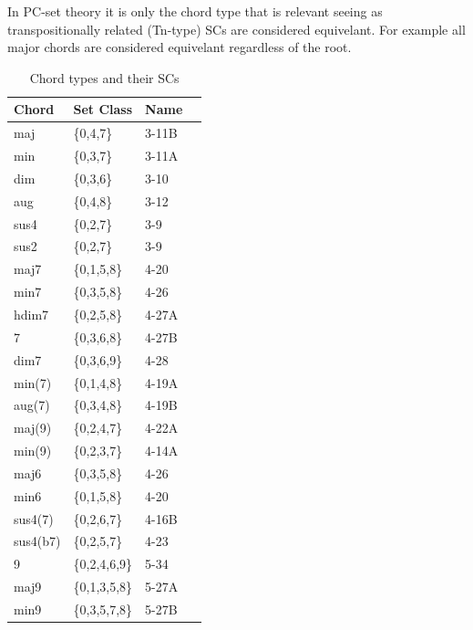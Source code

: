 \documentclass{article}
\begin{document}
In PC-set theory it is only the chord type that is relevant seeing as
transpositionally related (Tn-type) SCs are considered equivelant. For
example all major chords are considered equivelant regardless of the
root.
\begin{table}[htb]
\caption{Chord types and their SCs} 
\begin{center}
\begin{tabular}{lllr}

 Chord       &  Set Class          &  Name\\
\hline
 maj         &  \{0,4,7\}             &  3-11B  \\
 min         &  \{0,3,7\}             &  3-11A    \\
 dim         &  \{0,3,6\}             &  3-10    \\
 aug         &  \{0,4,8\}             &  3-12   \\
 sus4        &  \{0,2,7\}             &  3-9     \\
 sus2        &  \{0,2,7\}             &  3-9    \\
\hline
 maj7        &  \{0,1,5,8\}           &  4-20   \\
 min7        &  \{0,3,5,8\}           &  4-26      \\
 hdim7       &  \{0,2,5,8\}           &  4-27A \\
 7           &  \{0,3,6,8\}           &  4-27B     \\
 dim7        &  \{0,3,6,9\}           &  4-28    \\
 min(7)      &  \{0,1,4,8\}           &  4-19A   \\
 aug(7)      &  \{0,3,4,8\}           &  4-19B  \\
 maj(9)      &  \{0,2,4,7\}           &  4-22A    \\
 min(9)      &  \{0,2,3,7\}           &  4-14A   \\
 maj6        &  \{0,3,5,8\}           &  4-26     \\
 min6        &  \{0,1,5,8\}           &  4-20    \\
 sus4(7)     &  \{0,2,6,7\}           &  4-16B   \\
 sus4(b7)    &  \{0,2,5,7\}           &  4-23   \\
\hline
 9           &  \{0,2,4,6,9\}         &  5-34     \\
 maj9        &  \{0,1,3,5,8\}         &  5-27A      \\
 min9        &  \{0,3,5,7,8\}         &  5-27B     \\

\end{tabular}
\end{center}
\end{table}
\end{document}
